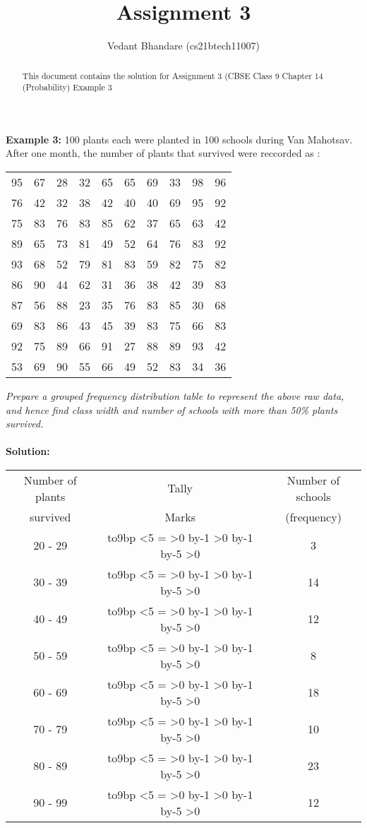 \documentclass[journal,12pt,twocolumn]{IEEEtran}
\title{Assignment 3}
\author{ Vedant Bhandare (cs21btech11007)}
\def\tallymarks#1{\leavevmode \lower1bp\vbox to9bp{}%
   \tmpnum=#1
   \loop \ifnum\tmpnum<5 \kern1bp \tallynum\tmpnum \else \tallyV \fi
         \advance\tmpnum by-5
         \ifnum\tmpnum>0 \repeat
}
\def\tallynum#1{\bgroup\tmpnum=#1\relax
   \loop \ifnum\tmpnum>0
         \kern1bp \tallyI \kern1bp
         \advance\tmpnum by-1
         \repeat
   \egroup
}
\def\tallyI{\pdfliteral{q .5 w 0 -1 m 0 8 l S Q}}
\def\tallyV{\kern1bp\pdfliteral{q .5 w -1 0 m 9 7 l S Q}\tallynum4\kern1bp }
\theoremstyle{remark}
\begin{document}
\maketitle
\begin{abstract}
This document contains the solution for Assignment 3 (CBSE Class 9 Chapter 14 (Probability) Example 3
\end{abstract}
\maketitle

\textbf{Example 3: } 100 plants each were planted in 100 schools during Van Mahotsav. After one month, the number of plants that survived were reccorded as :
\begin{center}
\begin{tabular}{c c c c c c c c c c}
95 & 67 & 28 & 32 & 65 & 65 & 69 & 33 & 98 & 96\\
76 & 42 & 32 & 38 & 42 & 40 & 40 & 69 & 95 & 92\\
75 & 83 & 76 & 83 & 85 & 62 & 37 & 65 & 63 & 42\\
89 & 65 & 73 & 81 & 49 & 52 & 64 & 76 & 83 & 92\\
93 & 68 & 52 & 79 & 81 & 83 & 59 & 82 & 75 & 82\\
86 & 90 & 44 & 62 & 31 & 36 & 38 & 42 & 39 & 83\\
87 & 56 & 88 & 23 & 35 & 76 & 83 & 85 & 30 & 68\\
69 & 83 & 86 & 43 & 45 & 39 & 83 & 75 & 66 & 83\\
92 & 75 & 89 & 66 & 91 & 27 & 88 & 89 & 93 & 42\\
53 & 69 & 90 & 55 & 66 & 49 & 52 & 83 & 34 & 36
\end{tabular}
\end{center}
\textit{Prepare a grouped frequency distribution table to represent the above raw data, and hence find class width and number of schools with more than 50\% plants survived.}\\
\\
\textbf{Solution: }
\begin{center}
\begin{tabular}{|c|c|c|}
\hline
Number of plants & Tally & Number of schools \\
survived & Marks & (frequency)\\
\hline
20 - 29 & \tallymarks{3} & 3\\
30 - 39 & \tallymarks{14} & 14\\
40 - 49 & \tallymarks{12} & 12\\
50 - 59 & \tallymarks{8} & 8\\
60 - 69 & \tallymarks{18} & 18\\
70 - 79 & \tallymarks{10} & 10\\
80 - 89 & \tallymarks{23} & 23\\
90 - 99 & \tallymarks{12} & 12\\
\hline
\end{tabular}
\end{center}
\end{document}
